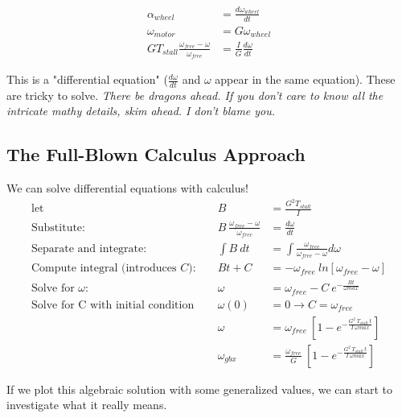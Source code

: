 \documentclass[10pt,letterpaper]{book}
\begin{document}
	\begin{align}
		\alpha_{wheel} &= \frac{d \omega_{wheel}}{dt} \\
		\omega_{motor} &= G \omega_{wheel} \\
		G T_{stall} \frac{\omega_{free} - \omega}{\omega_{free}} &= \frac{I}{G} \frac{d \omega}{dt}
	\end{align}
	
		This is a "differential equation" ($\frac{d \omega}{dt}$ and $\omega$ appear in the same equation). These are tricky to solve. \textit{There be dragons ahead. If you don't care to know all the intricate mathy details, skim ahead. I don't blame you.}
		
	\subsection{The Full-Blown Calculus Approach}
	
	We can solve differential equations with calculus!	
	\begin{align}
		\mbox{let }& &B  &= \frac{G^2 T_{stall}}{I} \\
		\mbox{Substitute: }& & B\ \frac{\omega_{free} - \omega}{\omega_{free}} &= \frac{d \omega}{d t} \\
		\mbox{Separate and integrate: }& & \int B\ dt &= \int \frac{\omega_{free}}{\omega_{free} - \omega} d \omega \\
		\mbox{Compute integral (introduces $C$): }& & B t + C &= -\omega_{free}\ ln[\omega_{free} - \omega] \\
		\mbox{Solve for $\omega$: }& & \omega &= \omega_{free} - C\ e^{-\frac{B t}{\omega{max}}} \\
		\mbox{Solve for C with initial condition }& & \omega(0) &= 0 \rightarrow C = \omega_{free} \\
		& &\omega &= \omega_{free}\ [1 - e^{-\frac{G^2\ T_{stall}\ t}{I\ \omega{max}}}] \\
		& &\omega_{gbx} &= \frac{\omega_{free}}{G}\ [1 - e^{-\frac{G^2\ T_{stall}\ t}{I\ \omega{max}}}]
	\end{align}	
	
	If we plot this algebraic solution with some generalized values, we can start to investigate what it really means.	
	
\end{document}
